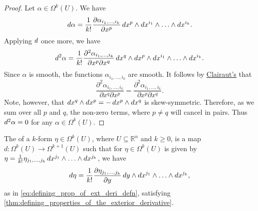 \documentclass[notoc,notitlepage]{tufte-book}
\begin{document}
\begin{proof}
  \noindent
   Let $\alpha
  \in \Omega^k(U)$. We have
  \begin{equation*}
    \mathop{}\!d{\alpha} = \frac{1}{k!} \frac{\partial \alpha_{i_1, \ldots, i_k}}{\partial x^p}
    \mathop{}\!d{x^p} \land \mathop{}\!d{x^{i_1}} \land \hdots \land \mathop{}\!d{x^{i_k}}.
  \end{equation*}
  Applying $\mathop{}\!d{}$ once more, we have
  \begin{equation*}
    \mathop{}\!d{^2 \alpha} = \frac{1}{k!} \frac{\partial^2 \alpha_{i_1, \ldots, i_k}}{\partial
      x^p \partial x^q} \mathop{}\!d{x^q} \land \mathop{}\!d{x^p} \land \mathop{}\!d{x^{i_1}} \land \hdots \land
    \mathop{}\!d{x^{i_k}}.
  \end{equation*}
  Since $\alpha$ is smooth, the functions $\alpha_{i_1, \ldots, i_k}$ are smooth. It
  follows by
  \href{https://en.wikipedia.org/wiki/Symmetry_of_second_derivatives}{Clairaut's} that
  \begin{equation*}
    \frac{\partial^2 \alpha_{i_1, \ldots, i_k}}{\partial x^q \partial x^p} =
    \frac{\partial^2 \alpha_{i_1, \ldots, i_k}}{\partial x^p \partial x^q}.
  \end{equation*}
  Note, however, that $\mathop{}\!d{x^q} \land \mathop{}\!d{x^p} = - \mathop{}\!d{x^p} \land \mathop{}\!d{x^q}$ is
  skew-symmetric. Therefore, as we sum over all $p$ and $q$, the non-zero terms, where $p
  \neq q$ will cancel in pairs. Thus $\mathop{}\!d{^2 \alpha} = 0$ for any $\alpha \in
  \Omega^k(U)$.
\end{proof}

\begin{defn}\label{defn:exterior_derivative}
  The  of a $k$-form $\eta \in \Omega^k(U)$, where $U
  \subseteq \mathbb{R}^n$ and $k \geq 0$, is a map $d : \Omega^k(U) \to \Omega^{k +
  1}(U)$ such that for $\eta \in \Omega^k(U)$ is given by $\eta = \frac{1}{k!} \eta_{j_1,
  \ldots, j_k} \mathop{}\!d{x^{j_1}} \land \hdots \land \mathop{}\!d{x^{j_k}}$, we have
  \begin{equation*}
    \mathop{}\!d{\eta} = \frac{1}{k!} \frac{\partial \eta_{j_1, \ldots, j_k}}{\partial y} \mathop{}\!d{y}
      \land \mathop{}\!d{x^{j_1}} \land \hdots \land \mathop{}\!d{x^{j_k}},
  \end{equation*}
  as in \cref{eq:defining_prop_of_ext_deri_defn}, satisfying
  \cref{thm:defining_properties_of_the_exterior_derivative}.
\end{defn}
\end{document}
